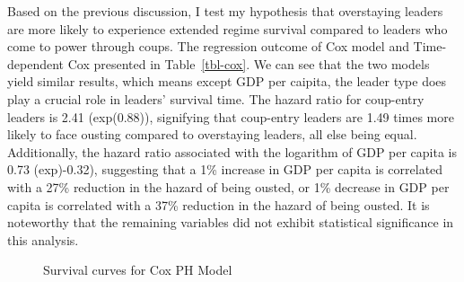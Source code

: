 \documentclass[
  12pt,
  a4paper,
  12pt]{article}
\begin{document}
Based on the previous discussion, I test my hypothesis that overstaying
leaders are more likely to experience extended regime survival compared
to leaders who come to power through coups. The regression outcome of
Cox model and Time-dependent Cox presented in Table~\ref{tbl-cox}. We
can see that the two models yield similar results, which means except
GDP per caipita, the leader type does play a crucial role in leaders'
survival time. The hazard ratio for coup-entry leaders is 2.41
(exp(0.88)), signifying that coup-entry leaders are 1.49 times more
likely to face ousting compared to overstaying leaders, all else being
equal. Additionally, the hazard ratio associated with the logarithm of
GDP per capita is 0.73 (exp)-0.32), suggesting that a 1\% increase in
GDP per capita is correlated with a 27\% reduction in the hazard of
being ousted, or 1\% decrease in GDP per capita is correlated with a
37\% reduction in the hazard of being ousted. It is noteworthy that the
remaining variables did not exhibit statistical significance in this
analysis.

\newpage

\begin{figure}


\caption{\label{fig-coxSurv1}Survival curves for Cox PH Model}

\end{figure}%
\end{document}
